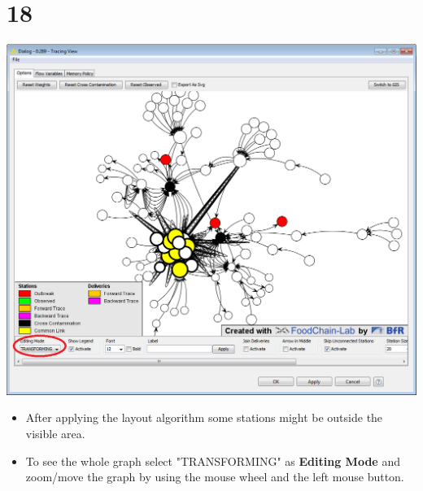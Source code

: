 \documentclass{beamer}
\begin{document}
\section{18}
\begin{frame}
	\begin{center}
  		\includegraphics[height=0.6\textheight]{18.png}
	\end{center}
	\begin{itemize}
		\item After applying the layout algorithm some stations might be outside the visible area.
		\item To see the whole graph select "TRANSFORMING" as \textbf{Editing Mode} and zoom/move the graph by using the mouse wheel and the left mouse button.
	\end{itemize}
\end{frame}
\end{document}
